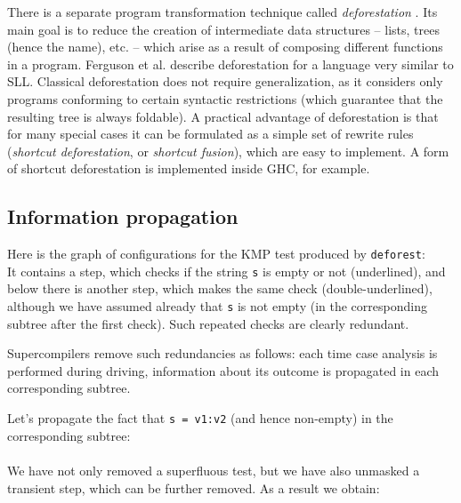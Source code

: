 
There is a separate program transformation technique 
called \emph{deforestation} \cite{Wadler1988deforestation,Ferguson1988When}.
Its main goal is to reduce the creation of intermediate data structures
-- lists, trees (hence the name), etc. -- which arise as a result of
composing different functions in a program.
Ferguson et al. \cite{Ferguson1988When} describe deforestation for a language
very similar to SLL.
Classical deforestation does not require generalization, as it considers
only programs conforming to certain syntactic restrictions
(which guarantee that the resulting tree is always foldable).
A practical advantage of deforestation is that for
many special cases it can be formulated as a simple set of
rewrite rules (\emph{shortcut deforestation}, or \emph{shortcut fusion}),
which are easy to implement. 
A form of shortcut deforestation is implemented inside GHC, for example.

\subsection{Information propagation}

Here is the graph of configurations for the KMP test produced by \texttt{deforest}:\\


It contains a step, which checks if the string \texttt{s} is empty or not (underlined),
and below there is another step, which makes the same check (double-underlined),
although we have assumed already that \texttt{s} is not empty 
(in the corresponding subtree after the first check). 
Such repeated checks are clearly redundant.

Supercompilers remove such redundancies as follows:
each time case analysis is performed during driving,
information about its outcome is propagated in each corresponding subtree.

Let's propagate the fact that \texttt{s = v1:v2} (and hence non-empty) in the corresponding subtree:\\
\\
We have not only removed a superfluous test, but we have also unmasked
a transient step, which can be further removed.
As a result we obtain:\\


